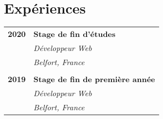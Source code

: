 \documentclass[a4paper, 12pt]{article}
\begin{document}
\begin{minipage}[t]{0.65\textwidth}
    \section*{\textcolor{sectioncolor}{Expériences}}
    \begin{tabular}{ m{} m{} }
        \textbf{2020} & \textbf{Stage de fin d'études} \\
        & \textit{Développeur Web} \\
        & \textit{Belfort, France} \\
        & \\
        \textbf{2019} & \textbf{Stage de fin de première année} \\
        & \textit{Développeur Web} \\
        & \textit{Belfort, France} \\
    \end{tabular}

\end{minipage}
\end{document}
